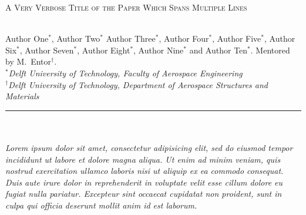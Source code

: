 \documentclass[a4paper, 10pt, twoside, dvipsnames]{article}
\newcommand{\doctitle}{A Very Verbose Title of the Paper Which Spans Multiple Lines}
\newcommand{\authors}{
Author One$^\ast$, 
Author Two$^\ast$
Author Three$^\ast$,
Author Four$^\ast$,
Author Five$^\ast$,
Author Six$^\ast$,
Author Seven$^\ast$,
Author Eight$^\ast$,
Author Nine$^\ast$ and
Author Ten$^\ast$}
\newcommand{\mentor}{M.~Entor$^\dagger$}
\newcommand{\Hrule}{\rule{\linewidth}{0.4mm}}
\begin{document}
\pagestyle{fancy}

\begin{center}
\parbox{\textwidth}{\centering\scshape\fontsize{24pt}{24pt}\selectfont \doctitle \par}
\vspace*{0.3cm}\\

\authors. Mentored by \mentor. \\[5pt]
$^\ast$\textsl{Delft University of Technology, Faculty of Aerospace Engineering} \\
$^\dagger$\textsl{Delft University of Technology, Department of Aerospace Structures and Materials}

\Hrule
\end{center}
%
\parbox{\textwidth}{\centering\scshape\LARGE {}}\\[2pt] \\
\textsl{Lorem ipsum dolor sit amet, consectetur adipisicing elit, sed do eiusmod tempor incididunt ut labore et dolore magna aliqua. Ut enim ad minim veniam, quis nostrud exercitation ullamco laboris nisi ut aliquip ex ea commodo consequat. Duis aute irure dolor in reprehenderit in voluptate velit esse cillum dolore eu fugiat nulla pariatur. Excepteur sint occaecat cupidatat non proident, sunt in culpa qui officia deserunt mollit anim id est laborum.} 

\vspace*{0.35cm}
\end{document}
